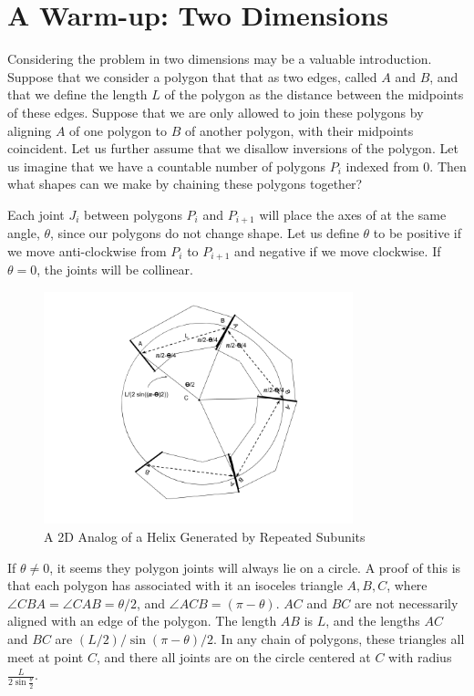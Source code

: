 \documentclass[11pt]{article}
\begin{document}
{\section{A Warm-up: Two Dimensions}

Considering the problem in two dimensions may be a valuable introduction.
Suppose that we consider a polygon that that as two edges, called $A$ and $B$, and that we define the length $L$ of the
polygon as the distance between the midpoints of these edges. Suppose that we are only allowed to join these
polygons by aligning $A$ of one polygon to $B$ of another polygon, with their midpoints coincident. Let us
further assume that we disallow inversions of the polygon.  Let us imagine that we have a
countable number of polygons $P_i$ indexed from $0$. Then what shapes can we make by chaining these
polygons together?

Each joint $J_i$ between polygons $P_i$ and $P_{i+1}$ will place the axes of at the same angle, $\theta$, since
our polygons do not change shape. Let us define $\theta$ to be positive
if we move anti-clockwise from $P_i$ to $P_{i+1}$ and negative if we move clockwise. 
If $\theta = 0$, the joints will be collinear.

\begin{figure}
     \centering
     \includegraphics[width=0.80\textwidth]{figures/2DPolygonStacking.png}
     \caption{A 2D Analog of a Helix Generated by Repeated Subunits}
  \label{fig:prismdiagram}
\end{figure}

If $\theta \neq 0$, it seems they polygon joints will always lie on a circle. A proof of this
is that each polygon has associated with it an isoceles triangle $A,B,C$, where $\angle CBA = \angle CAB = \theta/2$,
and $\angle ACB = (\pi - \theta)$. $AC$ and $BC$ are not necessarily aligned with an edge of the polygon.
The length $AB$ is $L$, and the lengths $AC$ and $BC$ are
$(L/2) / \sin{(\pi - \theta)/2}$. In any chain of polygons, these triangles all meet at point $C$, and there all
joints are on the circle centered at $C$ with radius $\frac{L}{2 \sin{\frac{\theta}{2}}}$.

}
\end{document}
